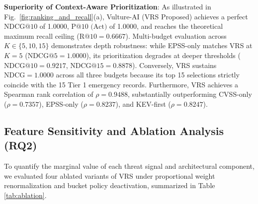 \documentclass[conference]{IEEEtran}
\begin{document}
\textbf{Superiority of Context-Aware Prioritization}: As illustrated in Fig.~\ref{fig:ranking_and_recall}(a), Vulture-AI (VRS Proposed) achieves a perfect $\text{NDCG@10}$ of 1.0000, $\text{P@10 (Act)}$ of 1.0000, and reaches the theoretical maximum recall ceiling ($\text{R@10} = 0.6667$). Multi-budget evaluation across $K \in \{5, 10, 15\}$ demonstrates depth robustness: while EPSS-only matches VRS at $K=5$ ($\text{NDCG@5} = 1.0000$), its prioritization degrades at deeper thresholds ($\text{NDCG@10} = 0.9217$, $\text{NDCG@15} = 0.8878$). Conversely, VRS sustains $\text{NDCG} = 1.0000$ across all three budgets because its top 15 selections strictly coincide with the 15 Tier 1 emergency records. Furthermore, VRS achieves a Spearman rank correlation of $\rho = 0.9488$, substantially outperforming CVSS-only ($\rho = 0.7357$), EPSS-only ($\rho = 0.8237$), and KEV-first ($\rho = 0.8247$).

\subsection{Feature Sensitivity and Ablation Analysis (RQ2)}
To quantify the marginal value of each threat signal and architectural component, we evaluated four ablated variants of VRS under proportional weight renormalization and bucket policy deactivation, summarized in Table \ref{tab:ablation}.

\begin{table}[t]
\centering
\caption{VRS Feature and Architecture Ablation Study ($N=41$: 39 real CVEs + 2 synthetic edge cases in Defer)}
\label{tab:ablation}
\end{table}
\end{document}

